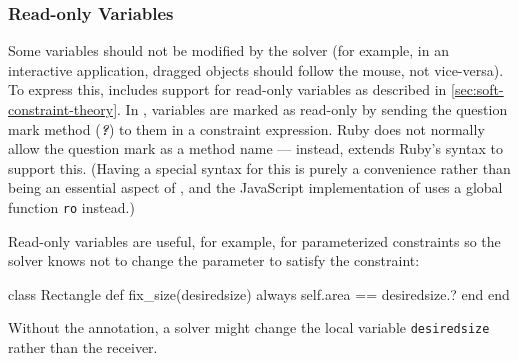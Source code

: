 \subsubsection{Read-only Variables}
Some variables should not be modified by the solver (for example, in
an interactive application, dragged objects should follow the mouse,
not vice-versa). To express this, \langname includes support for
read-only variables as described in
\autoref{sec:soft-constraint-theory}. In \toolname, variables are
marked as read-only by sending the question mark method
({\bfseries\emph{?}}) to them in a constraint expression. Ruby does
not normally allow the question mark as a method name --- instead,
\toolname extends Ruby's syntax to support this. (Having a special
syntax for this is purely a convenience rather than being an essential
aspect of \toolname, and the JavaScript implementation of \langname
\cite{felgentreff-ecoop-2014} uses a global function \lstinline{ro} instead.)

Read-only variables are useful, for example, for parameterized
constraints so the solver knows not to change the parameter to satisfy
the constraint:
\begin{code}
class Rectangle
  def fix_size(desiredsize)
    always { self.area == desiredsize.? }
  end
end
\end{code}

Without the annotation, a solver might
change the local variable \lstinline{desiredsize} rather than the
receiver.


